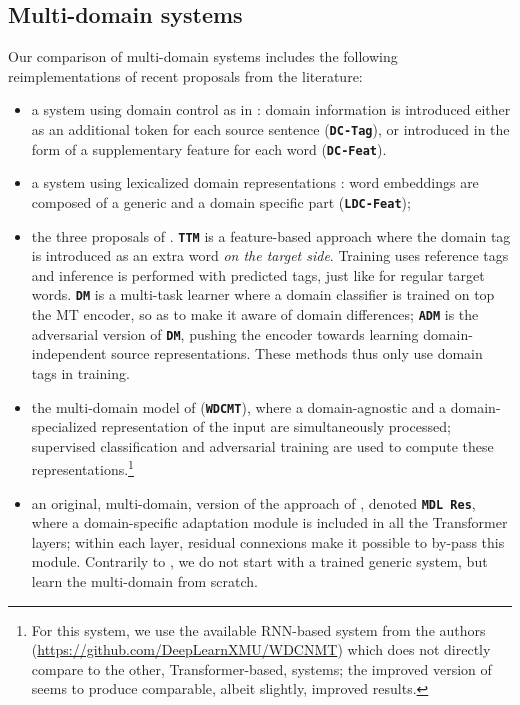 \documentclass[11pt,a4paper]{article}
\newcommand{\fyDone}[1]{\done[FY]\Todo[FY:]{\textcolor{orange}{#1}}}
\newcommand{\system}[1]{\texttt{\textbf{#1}}}
\begin{document}
\subsection{Multi-domain systems \label{ssec:systems}}
\fyDone{Remove Gated residual}
Our comparison of multi-domain systems includes the following reimplementations of recent proposals from the literature:
\begin{itemize}
\item a system using domain control as in \cite{Kobus17domaincontrol}: domain information is introduced either as an additional token for each source sentence (\system{DC-Tag}), or introduced in the form of a supplementary feature for each word (\system{DC-Feat}).
\item a system using lexicalized domain representations \cite{Pham19generic}: word embeddings are composed of a generic and a domain specific part (\system{LDC-Feat});
\item the three proposals of . \system{TTM} is a feature-based approach where the domain tag is introduced as an extra word \textsl{on the target side}. Training uses reference tags and inference is performed with predicted tags, just like for regular target words. \system{DM} is a multi-task learner where a domain classifier is trained on top the MT encoder, so as to make it aware of domain differences; \system{ADM} is the adversarial version of \system{DM}, pushing the encoder towards learning domain-independent source representations. These methods thus only use domain tags in training.
\item the multi-domain model of  (\system{WDCMT}), where a domain-agnostic and a domain-specialized representation of the input are simultaneously processed; supervised classification and adversarial training are used to compute these representations.\footnote{For this system, we use the available RNN-based system from the authors (\url{https://github.com/DeepLearnXMU/WDCNMT}\fyDone{URLs}) which does not directly compare to the other, Transformer-based, systems; the improved version of \cite{Su19exploring} seems to produce comparable, albeit slightly, improved results.}\fyDone{Check this}
\item an original, multi-domain, version of the approach of , denoted \system{MDL Res}, where a domain-specific adaptation module is included in all the Transformer layers; within each layer, residual connexions make it possible to by-pass this module.
Contrarily to \cite{Bapna19simple}, we do not start with a trained generic system, but learn the multi-domain from scratch.\fyDone{Check this.}
\end{itemize}
\end{document}
